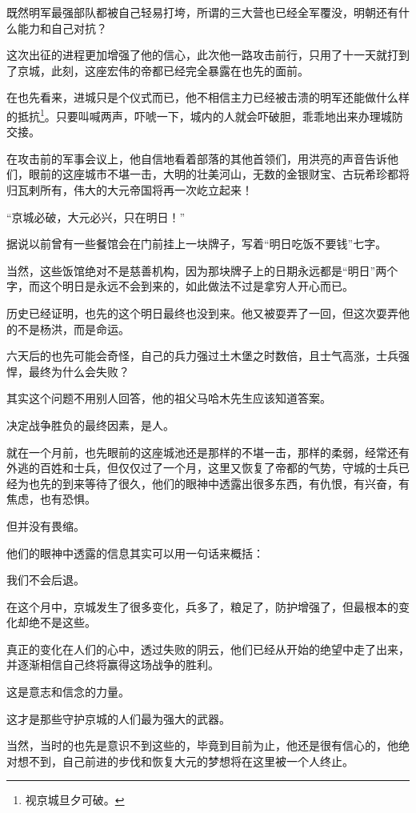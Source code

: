 \begin{multicols}{\theparacolNo}
既然明军最强部队都被自己轻易打垮，所谓的三大营也已经全军覆没，明朝还有什么能力和自己对抗？

这次出征的进程更加增强了他的信心，此次他一路攻击前行，只用了十一天就打到了京城，此刻，这座宏伟的帝都已经完全暴露在也先的面前。

在也先看来，进城只是个仪式而已，他不相信主力已经被击溃的明军还能做什么样的抵抗\footnote{视京城旦夕可破。}。只要叫喊两声，吓唬一下，城内的人就会吓破胆，乖乖地出来办理城防交接。

在攻击前的军事会议上，他自信地看着部落的其他首领们，用洪亮的声音告诉他们，眼前的这座城市不堪一击，大明的壮美河山，无数的金银财宝、古玩希珍都将归瓦剌所有，伟大的大元帝国将再一次屹立起来！

“京城必破，大元必兴，只在明日！”

据说以前曾有一些餐馆会在门前挂上一块牌子，写着“明日吃饭不要钱”七字。

当然，这些饭馆绝对不是慈善机构，因为那块牌子上的日期永远都是“明日”两个字，而这个明日是永远不会到来的，如此做法不过是拿穷人开心而已。

历史已经证明，也先的这个明日最终也没到来。他又被耍弄了一回，但这次耍弄他的不是杨洪，而是命运。

六天后的也先可能会奇怪，自己的兵力强过土木堡之时数倍，且士气高涨，士兵强悍，最终为什么会失败？

其实这个问题不用别人回答，他的祖父马哈木先生应该知道答案。

决定战争胜负的最终因素，是人。

就在一个月前，也先眼前的这座城池还是那样的不堪一击，那样的柔弱，经常还有外逃的百姓和士兵，但仅仅过了一个月，这里又恢复了帝都的气势，守城的士兵已经为也先的到来等待了很久，他们的眼神中透露出很多东西，有仇恨，有兴奋，有焦虑，也有恐惧。

但并没有畏缩。

他们的眼神中透露的信息其实可以用一句话来概括：

我们不会后退。

在这个月中，京城发生了很多变化，兵多了，粮足了，防护增强了，但最根本的变化却绝不是这些。

真正的变化在人们的心中，透过失败的阴云，他们已经从开始的绝望中走了出来，并逐渐相信自己终将赢得这场战争的胜利。

这是意志和信念的力量。

这才是那些守护京城的人们最为强大的武器。

当然，当时的也先是意识不到这些的，毕竟到目前为止，他还是很有信心的，他绝对想不到，自己前进的步伐和恢复大元的梦想将在这里被一个人终止。


\end{multicols}
